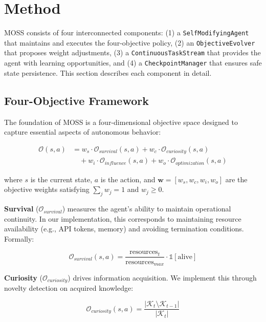 \documentclass{article}
\begin{document}
\section{Method}
\label{sec:method}

MOSS consists of four interconnected components: (1) a \texttt{SelfModifyingAgent} that maintains and executes the four-objective policy, (2) an \texttt{ObjectiveEvolver} that proposes weight adjustments, (3) a \texttt{ContinuousTaskStream} that provides the agent with learning opportunities, and (4) a \texttt{CheckpointManager} that ensures safe state persistence. This section describes each component in detail.

\subsection{Four-Objective Framework}

The foundation of MOSS is a four-dimensional objective space designed to capture essential aspects of autonomous behavior:

\begin{align}
\mathcal{O}(s, a) &= w_s \cdot \mathcal{O}_{survival}(s, a) + w_c \cdot \mathcal{O}_{curiosity}(s, a) \nonumber \\
&\quad + w_i \cdot \mathcal{O}_{influence}(s, a) + w_o \cdot \mathcal{O}_{optimization}(s, a)
\end{align}

where $s$ is the current state, $a$ is the action, and $\mathbf{w} = [w_s, w_c, w_i, w_o]$ are the objective weights satisfying $\sum_j w_j = 1$ and $w_j \geq 0$.

\textbf{Survival} ($\mathcal{O}_{survival}$) measures the agent's ability to maintain operational continuity. In our implementation, this corresponds to maintaining resource availability (e.g., API tokens, memory) and avoiding termination conditions. Formally:

\begin{equation}
\mathcal{O}_{survival}(s, a) = \frac{\text{resources}_t}{\text{resources}_{max}} \cdot \mathbb{1}[\text{alive}]
\end{equation}

\textbf{Curiosity} ($\mathcal{O}_{curiosity}$) drives information acquisition. We implement this through novelty detection on acquired knowledge:

\begin{equation}
\mathcal{O}_{curiosity}(s, a) = \frac{|\mathcal{K}_t \setminus \mathcal{K}_{t-1}|}{|\mathcal{K}_t|}
\end{equation}
\end{document}
